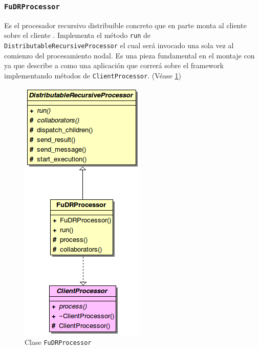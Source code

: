 % 
% 
% 
% 

        
    \subsubsection{\texttt{FuDRProcessor}}

        Es el procesador recursivo distribuible concreto que en parte monta al cliente \rc{} sobre el cliente \fud{}.
        Implementa el método \texttt{run} de \\ \texttt{DistributableRecursiveProcessor} el cual será invocado una sola
        vez al comienzo del procesamiento nodal. Es una pieza fundamental en el montaje con \fud{} ya que describe a
        \rc{} como una aplicación que correrá sobre el framework implementando métodos de \texttt{ClientProcessor}.
        (Véase \ref{FuDRProcessor})
    
        \begin{figure}[ht] \hspace{4.2cm}
            \includegraphics[scale=0.70]{images/frp.png}
            \caption{Clase \texttt{FuDRProcessor}}
             \label{FuDRProcessor}
        \end{figure}


